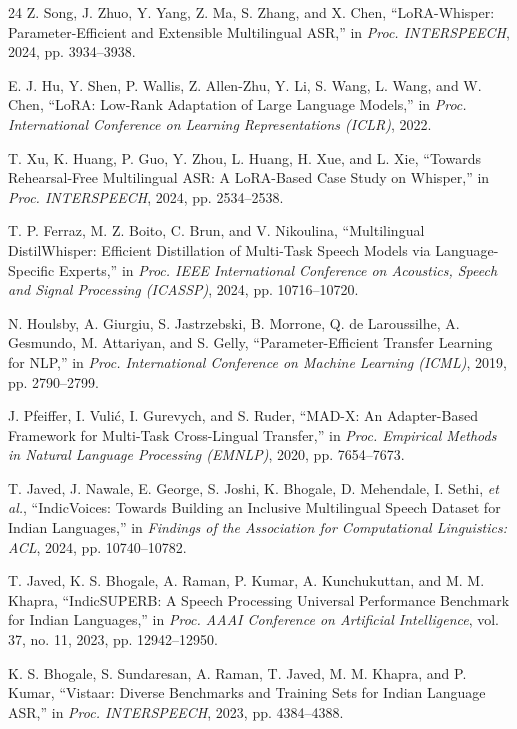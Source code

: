 \documentclass[conference]{IEEEtran}
\begin{document}
\begin{thebibliography}{24}
Z. Song, J. Zhuo, Y. Yang, Z. Ma, S. Zhang, and X. Chen, ``LoRA-Whisper:
Parameter-Efficient and Extensible Multilingual ASR,'' in \emph{Proc.
INTERSPEECH}, 2024, pp. 3934--3938.

E. J. Hu, Y. Shen, P. Wallis, Z. Allen-Zhu, Y. Li, S. Wang, L. Wang, and
W. Chen, ``LoRA: Low-Rank Adaptation of Large Language Models,'' in
\emph{Proc. International Conference on Learning Representations
(ICLR)}, 2022.

T. Xu, K. Huang, P. Guo, Y. Zhou, L. Huang, H. Xue, and L. Xie,
``Towards Rehearsal-Free Multilingual ASR: A LoRA-Based Case Study on
Whisper,'' in \emph{Proc. INTERSPEECH}, 2024, pp. 2534--2538.

T. P. Ferraz, M. Z. Boito, C. Brun, and V. Nikoulina, ``Multilingual
DistilWhisper: Efficient Distillation of Multi-Task Speech Models via
Language-Specific Experts,'' in \emph{Proc. IEEE International
Conference on Acoustics, Speech and Signal Processing (ICASSP)}, 2024,
pp. 10716--10720.

N. Houlsby, A. Giurgiu, S. Jastrzebski, B. Morrone, Q. de Laroussilhe,
A. Gesmundo, M. Attariyan, and S. Gelly, ``Parameter-Efficient Transfer
Learning for NLP,'' in \emph{Proc. International Conference on Machine
Learning (ICML)}, 2019, pp. 2790--2799.

J. Pfeiffer, I. Vuli\'{c}, I. Gurevych, and S. Ruder, ``MAD-X: An
Adapter-Based Framework for Multi-Task Cross-Lingual Transfer,'' in
\emph{Proc. Empirical Methods in Natural Language Processing (EMNLP)},
2020, pp. 7654--7673.

T. Javed, J. Nawale, E. George, S. Joshi, K. Bhogale, D. Mehendale,
I. Sethi, \emph{et al.},
``IndicVoices: Towards Building an Inclusive Multilingual Speech Dataset
for Indian Languages,'' in \emph{Findings of the Association for
Computational Linguistics: ACL}, 2024, pp. 10740--10782.

T. Javed, K. S. Bhogale, A. Raman, P. Kumar, A. Kunchukuttan, and
M. M. Khapra, ``IndicSUPERB: A Speech Processing Universal Performance
Benchmark for Indian Languages,'' in \emph{Proc. AAAI Conference on
Artificial Intelligence}, vol. 37, no. 11, 2023, pp. 12942--12950.

K. S. Bhogale, S. Sundaresan, A. Raman, T. Javed, M. M. Khapra, and
P. Kumar, ``Vistaar: Diverse Benchmarks and Training Sets for Indian
Language ASR,'' in \emph{Proc. INTERSPEECH}, 2023, pp. 4384--4388.


\end{thebibliography}
\end{document}

